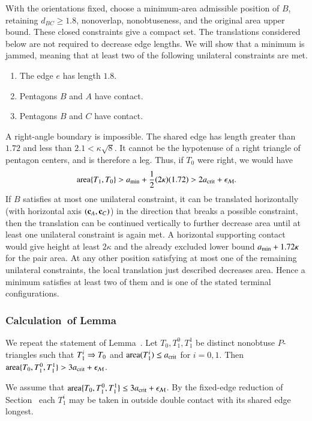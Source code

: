 With the orientations fixed, choose a minimum-area admissible
position of $B$, retaining $d_{BC}\ge1.8$, nonoverlap,
nonobtuseness, and the original area upper bound. These closed
constraints give a compact set. The translations considered below
are not required to decrease edge lengths. We will show that a
minimum is jammed, meaning that at least two of the following
unilateral constraints are met.
\begin{enumerate}
\item The edge $e$ has length $1.8$.
\item Pentagons $B$ and $A$ have contact.
\item Pentagons $B$ and $C$ have contact.
\end{enumerate}
 
A right-angle boundary is impossible. The shared edge has length
greater than $1.72$ and less than $2.1<\kappa\sqrt8$. It cannot be
the hypotenuse of a right triangle of pentagon centers, and is
therefore a leg. Thus, if $T_0$ were right, we would have
\[
{\operatorname{area}}\{T_1,T_0\} > a_\text{min} + \frac12(2\kappa)(1.72) > 2 a_\text{crit} + \epsilon_{\mathcal M}.
\]
If $B$ satisfies at most one unilateral constraint, it can be translated
horizontally (with horizontal axis $({\mathbf c}_A,{\mathbf c}_C)$) in the direction that breaks a
possible constraint,
then the translation can be continued vertically to further decrease area until
at least one unilateral constraint is again met.
A horizontal supporting contact would give height at least
$2\kappa$ and the already excluded lower bound $a_\text{min}+1.72\kappa$
for the pair area. At any other position satisfying at most one
of the remaining unilateral constraints, the local translation
just described decreases area. Hence a minimum satisfies at least
two of them and is one of the stated terminal configurations.

\subsubsection{Calculation~of Lemma~} %

We repeat the statement of Lemma~. Let
$T_0,T_1^0,T_1^1$ be distinct nonobtuse $P$-triangles such that
$T_1^i\Rightarrow T_0$ and ${\operatorname{area}}(T_1^i)\le a_\text{crit}$ for $i=0,1$. Then ${\operatorname{area}}\{T_0,T_1^0,T_1^1\} > 3a_\text{crit} +
\epsilon_{\mathcal M}$. %

We assume that ${\operatorname{area}}\{T_0,T_1^0,T_1^1\}\le 3a_\text{crit} + \epsilon_{\mathcal M}$.
By the fixed-edge reduction of Section~ each $T_1^i$
may be taken in outside double contact with its shared edge longest.

